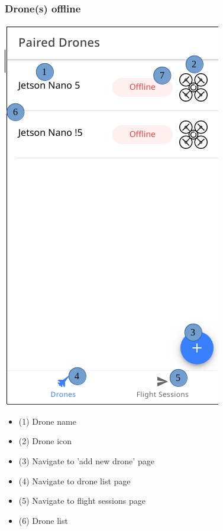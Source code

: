 \subsubsection{Drone(s) offline}
\begin{minipage}[c]{0.5\linewidth}
	\centering
	\includegraphics[scale=0.4]{./assets/images/offline.png}
	\label{fig: mainPageOffline}
\end{minipage}
\begin{minipage}[c]{0.5\linewidth}
	\begin{itemize}
		\item (1) Drone name
		\item (2) Drone icon
		\item (3) Navigate to 'add new drone' page
		\item (4) Navigate to drone list page
		\item (5) Navigate to flight sessions page
		\item (6) Drone list
	\end{itemize}
\end{minipage}

